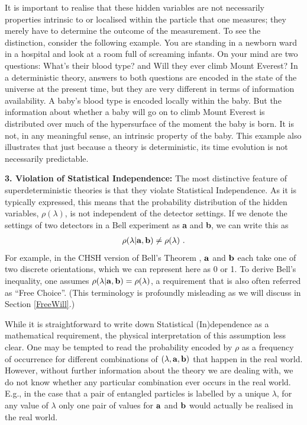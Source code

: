 \documentclass[12pt]{article}
\def\beqn{\begin{eqnarray}}
\def\eeqn{\end{eqnarray}}
\begin{document}
It is important to realise that these hidden variables are not necessarily properties intrinsic to or localised within the particle that one measures; they merely have to determine the outcome of the measurement. To see the distinction, consider the following example. You are standing in a newborn ward in a hospital and look at a room full of screaming infants. On your mind are two questions: What's their blood type? and Will they ever climb Mount Everest? In a deterministic theory, answers to both questions are encoded in the state of the universe at the present time, but they are very different in terms of information availability. A baby's blood type is encoded locally within the baby. But the information about whether a baby will go on to climb Mount Everest is distributed over much of the hypersurface of the moment the baby is born. It is not, in any meaningful sense, an intrinsic property of the baby. This example also illustrates that just because a theory is deterministic, its time evolution is not necessarily predictable. 

{\bf 3. Violation of Statistical Independence:} The most distinctive feature of superdeterministic theories is that they violate Statistical Independence. As it is typically expressed,  this means that the probability distribution of the hidden variables, $\rho(\lambda)$, is not independent of the detector settings. If we denote the settings of two detectors in a Bell experiment as {\bf a} and {\bf b}, we can write this as
\beqn
\rho (\lambda |{\bf a}, {\bf b}) \neq \rho (\lambda) ~.
\eeqn
For example, in the {\sc CHSH} version of Bell's Theorem \cite{CHSH}, $\bf a$ and $\bf b$ each take one of two discrete orientations, which we can represent here as 0 or 1. To derive Bell's inequality, one assumes $\rho (\lambda | {\bf a}, {\bf b}) = \rho (\lambda)$, a requirement that is also often referred as ``Free Choice''. (This terminology is profoundly misleading as we will discuss in Section \ref{FreeWill}.)

While it is straightforward to write down Statistical (In)dependence as a mathematical requirement, the physical interpretation of this assumption less clear.
One may be tempted to read the probability encoded by $\rho$ as a frequency of occurrence for different combinations of $(\lambda, {\bf a}, {\bf b})$ that happen in the real world. However, without further information about the theory we are dealing with, we do not know whether any particular combination ever occurs in the real world. E.g., in the case that a pair of entangled particles is labelled by a unique $\lambda$, for any value of $\lambda$ only one pair of values for $\bf a$ and $\bf b$ would actually be realised in the real world. 
\end{document}

